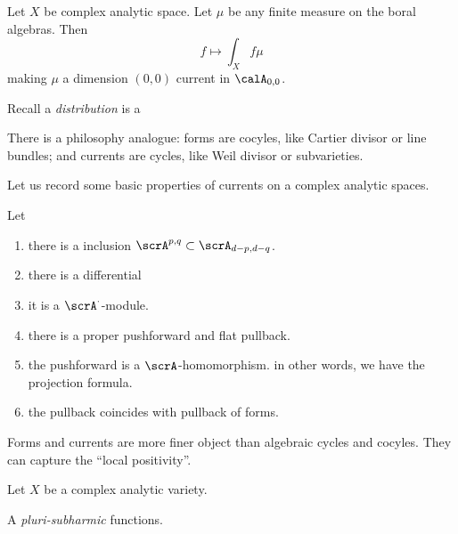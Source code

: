 \begin{example}[label=\labelNFM{eg:measure-and-distribution-as-currents}, status=draft, tag=0000000]
	Let $X$ be complex analytic space.
	Let $\mu$ be any finite measure on the boral algebras.
	Then 
	\[ f \mapsto \int_X f \mu \]
	making $\mu$ a dimension $(0,0)$ current in $\calA_{0,0}$.

	Recall a \emph{distribution} is a 
	\Yang{}
\end{example}

\begin{slogan}
	There is a philosophy analogue: forms are cocyles, like Cartier divisor or line bundles; and currents are cycles, like Weil divisor or subvarieties.
	\Yang{}
\end{slogan}

Let us record some basic properties of currents on a complex analytic spaces.

\begin{proposition}[label=\labelNFM{prop:basic-properties}, status=draft, tag=0000000]
	Let \Yang{}
	\begin{enumerate}
		\item there is a inclusion $\scrA^{p,q} \subset \scrA_{d-p,d-q}$.
		\item there is a differential
		\item it is a $\scrA^\cdot$-module.
		\item there is a proper pushforward and flat pullback.
		\item the pushforward is a $\scrA$-homomorphism. in other words, we have the projection formula.
		\item the pullback coincides with pullback of forms.
	\end{enumerate}
	\Yang{}
\end{proposition}

Forms and currents are more finer object than algebraic cycles and cocyles.
They can capture the ``local positivity''.

\begin{definition}[label=\labelNFM{def:positivity-of-forms-and-currents}, status=draft, tag=0000000]
	Let $X$ be a complex analytic variety.
	
\end{definition}




\begin{definition}[label=\labelNFM{def:psh-function}, status=draft, tag=0000000]
	A \emph{pluri-subharmic} functions.
	\Yang{}
\end{definition}

